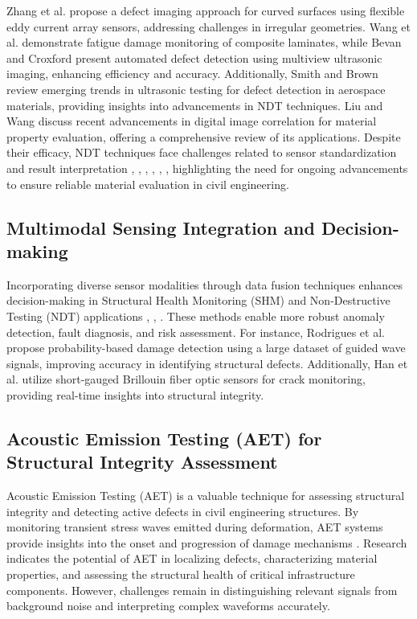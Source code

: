 \documentclass[journal, a4paper]{IEEEtran}
\begin{document}
Zhang et al. \cite{zhang_defect_2020} propose a defect imaging approach for curved surfaces using flexible eddy current array sensors, addressing challenges in irregular geometries. Wang et al. \cite{wang_fatigue_2023} demonstrate fatigue damage monitoring of composite laminates, while Bevan and Croxford \cite{bevan_automated_2022} present automated defect detection using multiview ultrasonic imaging, enhancing efficiency and accuracy. Additionally, Smith and Brown \cite{sanchez-romate_structural_2021} review emerging trends in ultrasonic testing for defect detection in aerospace materials, providing insights into advancements in NDT techniques. Liu and Wang \cite{meng_effects_2021} discuss recent advancements in digital image correlation for material property evaluation, offering a comprehensive review of its applications. Despite their efficacy, NDT techniques face challenges related to sensor standardization and result interpretation \cite{zhang_defect_2020}, \cite{wang_fatigue_2023}, \cite{bevan_automated_2022}, \cite{tabjula_sparse_2023}, \cite{sanchez-romate_structural_2021}, \cite{meng_effects_2021}, highlighting the need for ongoing advancements to ensure reliable material evaluation in civil engineering.


\subsection{Multimodal Sensing Integration and Decision-making}
Incorporating diverse sensor modalities through data fusion techniques enhances decision-making in Structural Health Monitoring (SHM) and Non-Destructive Testing (NDT) applications \cite{de_sa_rodrigues_probability_2023}, \cite{li_physics-informed_2023}, \cite{tabjula_sparse_2023}. These methods enable more robust anomaly detection, fault diagnosis, and risk assessment. For instance, Rodrigues et al. \cite{de_sa_rodrigues_probability_2023} propose probability-based damage detection using a large dataset of guided wave signals, improving accuracy in identifying structural defects. Additionally, Han et al. \cite{tabjula_sparse_2023} utilize short-gauged Brillouin fiber optic sensors for crack monitoring, providing real-time insights into structural integrity.


\subsection{Acoustic Emission Testing (AET) for Structural Integrity Assessment}
Acoustic Emission Testing (AET) is a valuable technique for assessing structural integrity and detecting active defects
in civil engineering structures. By monitoring transient stress waves emitted during deformation, AET systems provide
insights into the onset and progression of damage mechanisms
\cite{katunin_modeling_2021} \cite{zhang_spatial_2023} \cite{li_physics-informed_2023}. Research indicates the potential of AET
in localizing defects, characterizing material properties, and assessing the structural health of critical infrastructure
components. However, challenges remain in distinguishing relevant signals from background noise and interpreting complex
waveforms accurately.
\end{document}
